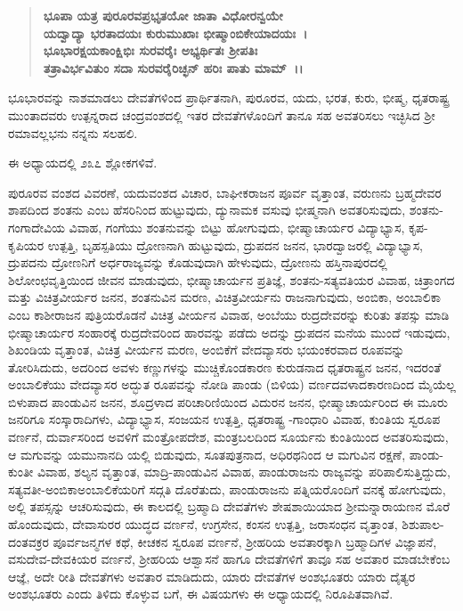 \begin{verse}
\textbf{ಭೂಪಾ ಯತ್ರ ಪುರೂರವಪ್ರಭೃತಯೋ ಜಾತಾ ವಿಧೋರನ್ವಯೇ}\\\textbf{ಯದ್ವಾದ್ಯಾ ಭರತಾದಯಃ ಕುರುಮುಖಾಃ ಭೀಷ್ಮಾಂಬಿಕೇಯಾದಯಃ~।} \\\textbf{ಭೂಭಾರಕ್ಷಯಕಾಂಕ್ಷಿಭಿಃ ಸುರವರೈಃ ಅಭ್ಯರ್ಥಿತಃ ಶ‍್ರೀಪತಿಃ}\\\textbf{ತತ್ರಾವಿರ್ಭವಿತುಂ ಸದಾ ಸುರವರೈರಿಚ್ಛನ್ ಹರಿಃ ಪಾತು ಮಾಮ್~।।}
\end{verse}

ಭೂಭಾರವನ್ನು ನಾಶಮಾಡಲು ದೇವತೆಗಳಿಂದ ಪ್ರಾರ್ಥಿತನಾಗಿ, ಪುರೂರವ, ಯದು, ಭರತ, ಕುರು, ಭೀಷ್ಮ, ಧೃತರಾಷ್ಟ್ರ ಮುಂತಾದವರು ಉತ್ಪನ್ನರಾದ ಚಂದ್ರವಂಶದಲ್ಲಿ ಇತರ ದೇವತೆಗಳೊಂದಿಗೆ ತಾನೂ ಸಹ ಅವತರಿಸಲು ಇಚ್ಛಿಸಿದ ಶ‍್ರೀ ರಮಾವಲ್ಲಭನು ನನ್ನನು ಸಲಹಲಿ.

ಈ ಅಧ್ಯಾಯದಲ್ಲಿ ೨೩೭ ಶ್ಲೋಕಗಳಿವೆ.

ಪುರೂರವ ವಂಶದ ವಿವರಣೆ, ಯದುವಂಶದ ವಿಚಾರ, ಬಾಘೀಕರಾಜನ ಪೂರ್ವ ವೃತ್ತಾಂತ, ವರುಣನು ಬ್ರಹ್ಮದೇವರ ಶಾಪದಿಂದ ಶಂತನು ಎಂಬ ಹೆಸರಿನಿಂದ ಹುಟ್ಟುವುದು, ದ್ಯುನಾಮಕ ವಸುವು ಭೀಷ್ಮನಾಗಿ ಅವತರಿಸುವುದು, ಶಂತನು-ಗಂಗಾದೇವಿಯ ವಿವಾಹ, ಗಂಗೆಯು ಶಂತನುವನ್ನು ಬಿಟ್ಟು ಹೋಗುವುದು, ಭೀಷ್ಮಾಚಾರ್ಯರ ವಿದ್ಯಾಭ್ಯಾಸ, ಕೃಪ-\-ಕೃಪಿಯರ ಉತ್ಪತ್ತಿ, ಬೃಹಸ್ಪತಿಯು ದ್ರೋಣನಾಗಿ ಹುಟ್ಟುವುದು, ದ್ರುಪದನ ಜನನ, ಭಾರದ್ವಾಜರಲ್ಲಿ ವಿದ್ಯಾಭ್ಯಾಸ, ದ್ರುಪದನು ದ್ರೋಣನಿಗೆ ಅರ್ಧರಾಜ್ಯವನ್ನು ಕೊಡುವುದಾಗಿ ಹೇಳುವುದು, ದ್ರೋಣನು ಹಸ್ತಿನಾಪುರದಲ್ಲಿ ಶಿಲೋಂಛವೃತ್ತಿಯಿಂದ ಜೀವನ ಮಾಡುವುದು, ಭೀಷ್ಮಾಚಾರ್ಯನ ಪ್ರತಿಜ್ಞೆ, ಶಂತನು-ಸತ್ಯವತಿಯರ ವಿವಾಹ, ಚಿತ್ರಾಂಗದ ಮತ್ತು ವಿಚಿತ್ರವೀರ್ಯರ ಜನನ, ಶಂತನುವಿನ ಮರಣ, ವಿಚಿತ್ರವೀರ್ಯನು ರಾಜನಾಗುವುದು, ಅಂಬಿಕಾ, ಅಂಬಾಲಿಕಾ ಎಂಬ ಕಾಶೀರಾಜನ ಪುತ್ರಿಯರೊಡನೆ ವಿಚಿತ್ರ ವೀರ್ಯನ ವಿವಾಹ, ಅಂಬೆಯು ರುದ್ರದೇವರನ್ನು ಕುರಿತು ತಪಸ್ಸು ಮಾಡಿ ಭೀಷ್ಮಾಚಾರ್ಯರ ಸಂಹಾರಕ್ಕೆ ರುದ್ರದೇವರಿಂದ ಹಾರವನ್ನು ಪಡೆದು ಅದನ್ನು ದ್ರುಪದನ ಮನೆಯ ಮುಂದೆ ಇಡುವುದು, ಶಿಖಂಡಿಯ ವೃತ್ತಾಂತ, ವಿಚಿತ್ರ ವೀರ್ಯನ ಮರಣ, ಅಂಬಿಕೆಗೆ ವೇದವ್ಯಾಸರು ಭಯಂಕರವಾದ ರೂಪವನ್ನು ತೋರಿಸಿದುದು, ಅದರಿಂದ ಅವಳು ಕಣ್ಣುಗಳನ್ನು ಮುಚ್ಚಿಕೊಂಡಕಾರಣ ಕುರುಡನಾದ ಧೃತರಾಷ್ಟ್ರನ ಜನನ, ಇದರಂತೆ ಅಂಬಾಲಿಕೆಯು ವೇದವ್ಯಾಸರ ಅದ್ಭುತ ರೂಪವನ್ನು ನೋಡಿ ಪಾಂಡು (ಬಿಳಿಯ) ವರ್ಣದವಳಾದಕಾರಣದಿಂದ ಮೈಯೆಲ್ಲ ಬಿಳುಪಾದ ಪಾಂಡುವಿನ ಜನನ, ಶೂದ್ರಳಾದ ಪರಿಚಾರಿಣಿಯಿಂದ ವಿದುರನ ಜನನ, ಭೀಷ್ಮಾಚಾರ್ಯರಿಂದ ಈ ಮೂರು ಜನರಿಗೂ ಸಂಸ್ಕಾರಾದಿಗಳು, ವಿದ್ಯಾಭ್ಯಾಸ, ಸಂಜಯನ ಉತ್ಪತ್ತಿ, ಧೃತರಾಷ್ಟ್ರ -\-ಗಾಂಧಾರಿ ವಿವಾಹ, ಕುಂತಿಯ ಸ್ವರೂಪ ವರ್ಣನೆ, ದುರ್ವಾಸರಿಂದ ಅವಳಿಗೆ ಮಂತ್ರೋಪದೇಶ, ಮಂತ್ರಬಲದಿಂದ ಸೂರ್ಯನು ಕುಂತಿಯಿಂದ ಅವತರಿಸುವುದು, ಆ ಮಗುವನ್ನು ಯಮುನಾನದಿ ಯಲ್ಲಿ ಬಿಡುವುದು, ಸೂತಪುತ್ರನಾದ, ಅಧಿರಥನಿಂದ ಆ ಮಗುವಿನ ರಕ್ಷಣೆ, ಪಾಂಡು-ಕುಂತೀ ವಿವಾಹ, ಶಲ್ಯನ ವೃತ್ತಾಂತ, ಮಾದ್ರಿ-ಪಾಂಡುವಿನ ವಿವಾಹ, ಪಾಂಡುರಾಜನು ರಾಜ್ಯವನ್ನು ಪರಿಪಾಲಿಸುತ್ತಿದ್ದುದು, ಸತ್ಯವತೀ-ಅಂಬಿಕಾ\-ಅಂಬಾಲಿಕೆಯರಿಗೆ ಸದ್ಗತಿ ದೊರೆತುದು, ಪಾಂಡುರಾಜನು ಪತ್ನಿಯರೊಂದಿಗೆ ವನಕ್ಕೆ ಹೋಗುವುದು, ಅಲ್ಲಿ ತಪಸ್ಸನ್ನು ಆಚರಿಸುವುದು, ಈ ಕಾಲದಲ್ಲಿ ಬ್ರಹ್ಮಾದಿ ದೇವತೆಗಳು ಶೇಷಶಾಯಿಯಾದ ಶ‍್ರೀಮನ್ನಾರಾಯಣನ ಮೊರೆ ಹೊಂದುವುದು, ದೇವಾಸುರರ ಯುದ್ಧದ ವರ್ಣನೆ, ಉಗ್ರಸೇನ, ಕಂಸನ ಉತ್ಪತ್ತಿ, ಜರಾಸಂಧನ ವೃತ್ತಾಂತ, ಶಿಶುಪಾಲ-ದಂತವಕ್ರರ ಪೂರ್ವಜನ್ಮಗಳ ಕಥೆ, ಕೀಚಕನ ಸ್ವರೂಪ ವರ್ಣನೆ, ಶ‍್ರೀಹರಿಯ ಅವತಾರಕ್ಕಾಗಿ ಬ್ರಹ್ಮಾದಿಗಳ ವಿಜ್ಞಾಪನೆ, ವಸುದೇವ-ದೇವಕಿಯರ ವರ್ಣನೆ, ಶ‍್ರೀಹರಿಯ ಆಶ್ವಾಸನೆ ಹಾಗೂ ದೇವತೆಗಳಿಗೆ ತಾವೂ ಸಹ ಅವತಾರ ಮಾಡಬೇಕೆಂಬ ಆಜ್ಞೆ, ಅದೇ ರೀತಿ ದೇವತೆಗಳು ಅವತಾರ ಮಾಡಿದುದು, ಯಾರು ದೇವತೆಗಳ ಅಂಶಭೂತರು ಯಾರು ದೈತ್ಯರ ಅಂಶಭೂತರು ಎಂದು ತಿಳಿದು ಕೊಳ್ಳುವ ಬಗೆ, ಈ ವಿಷಯಗಳು ಈ ಅಧ್ಯಾಯದಲ್ಲಿ ನಿರೂಪಿತವಾಗಿವೆ.

